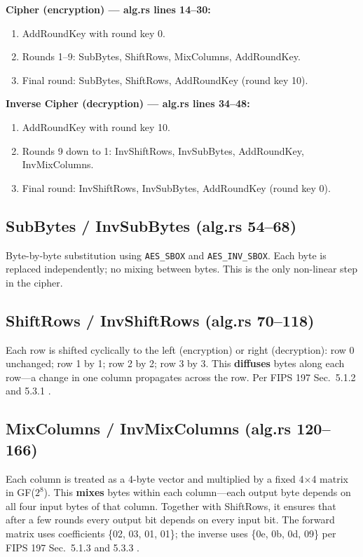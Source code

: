 \documentclass[11pt]{article}
\begin{document}
\textbf{Cipher (encryption) --- alg.rs lines 14--30:}
\begin{enumerate}
    \item AddRoundKey with round key 0.
    \item Rounds 1--9: SubBytes, ShiftRows, MixColumns, AddRoundKey.
    \item Final round: SubBytes, ShiftRows, AddRoundKey (round key 10).
\end{enumerate}

\textbf{Inverse Cipher (decryption) --- alg.rs lines 34--48:}
\begin{enumerate}
    \item AddRoundKey with round key 10.
    \item Rounds 9 down to 1: InvShiftRows, InvSubBytes, AddRoundKey, InvMixColumns.
    \item Final round: InvShiftRows, InvSubBytes, AddRoundKey (round key 0).
\end{enumerate}

\subsection*{SubBytes / InvSubBytes (alg.rs 54--68)}

Byte-by-byte substitution using \texttt{AES\_SBOX} and \texttt{AES\_INV\_SBOX}. Each byte is replaced independently; no mixing between bytes. This is the only non-linear step in the cipher.

\subsection*{ShiftRows / InvShiftRows (alg.rs 70--118)}

Each row is shifted cyclically to the left (encryption) or right (decryption): row 0 unchanged; row 1 by 1; row 2 by 2; row 3 by 3. This \textbf{diffuses} bytes along each row---a change in one column propagates across the row. Per FIPS 197 Sec.\ 5.1.2 and 5.3.1 \cite{NIST2001}.

\subsection*{MixColumns / InvMixColumns (alg.rs 120--166)}

Each column is treated as a 4-byte vector and multiplied by a fixed 4$\times$4 matrix in GF($2^8$). This \textbf{mixes} bytes within each column---each output byte depends on all four input bytes of that column. Together with ShiftRows, it ensures that after a few rounds every output bit depends on every input bit. The forward matrix uses coefficients \{02, 03, 01, 01\}; the inverse uses \{0e, 0b, 0d, 09\} per FIPS 197 Sec.\ 5.1.3 and 5.3.3 \cite{NIST2001}.
\end{document}
